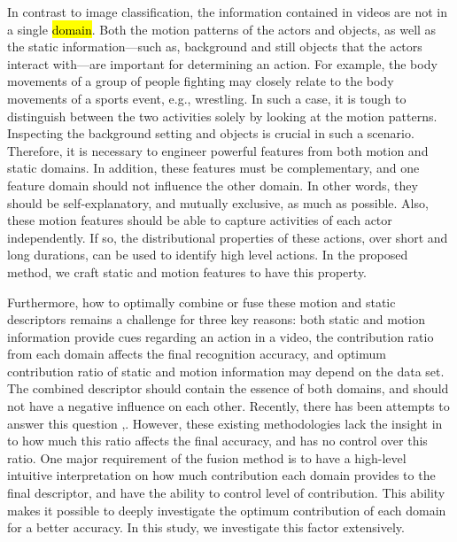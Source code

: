 In contrast to image classification, the information contained in videos
are not in a single \hl{domain}. Both the motion patterns of the actors and objects, as well as the static
 information---such as, background and still objects that the actors interact with---are important for determining an action.
For example, the body movements of a group of people fighting may closely relate to
the body movements of a sports event, e.g., wrestling. In such a case, it is tough to distinguish between the two
activities solely by looking at the motion patterns. Inspecting the background setting
and objects is crucial in such a scenario. Therefore, it is necessary to engineer powerful features
from both motion and static domains. In addition, these features must be complementary, and one feature domain should
not influence the other domain. In other words, they should be self-explanatory, and mutually exclusive, as much as possible.
Also, these motion features should be able to capture
activities of each actor independently. If so, the distributional properties of these actions, over short
and long durations, can be used to identify high level actions. In the proposed method, we craft static and motion features to have this property.

Furthermore, how to optimally combine or fuse these motion and static descriptors remains a challenge for three key reasons: both static and motion information
provide cues regarding an action in a video, the contribution ratio from each domain affects the final recognition accuracy,
and optimum contribution ratio of static and motion information may depend on the data set.
The combined descriptor should contain the essence of both domains, and should not have a
negative influence on each other. Recently, there has been attempts to answer this question \cite{7486474},\cite{simonyan2014two}. However,
these existing methodologies lack the insight in to how much this ratio affects the final accuracy, and has no control over this ratio. 
One major requirement of the fusion method is to have a high-level intuitive interpretation on how much contribution each domain provides to the
final descriptor, and have the ability to control level of contribution. This ability makes it possible
to deeply investigate the optimum contribution of each domain for a better accuracy. In this study, we investigate this factor
extensively.

